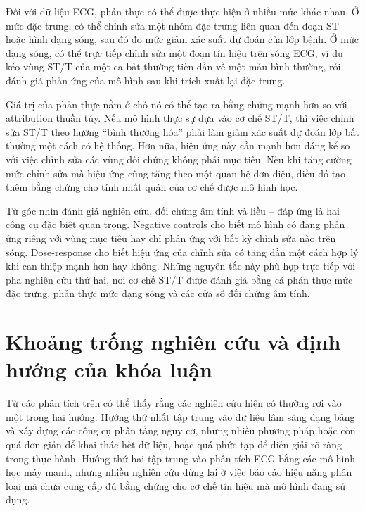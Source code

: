 Đối với dữ liệu ECG, phản thực có thể được thực hiện ở nhiều mức khác nhau. Ở mức đặc trưng, có thể chỉnh sửa một nhóm đặc trưng liên quan đến đoạn ST hoặc hình dạng sóng, sau đó đo mức giảm xác suất dự đoán của lớp bệnh. Ở mức dạng sóng, có thể trực tiếp chỉnh sửa một đoạn tín hiệu trên sóng ECG, ví dụ kéo vùng ST/T của một ca bất thường tiến dần về một mẫu bình thường, rồi đánh giá phản ứng của mô hình sau khi trích xuất lại đặc trưng.

\blocksep

Giá trị của phản thực nằm ở chỗ nó có thể tạo ra bằng chứng mạnh hơn so với attribution thuần túy. Nếu mô hình thực sự dựa vào cơ chế ST/T, thì việc chỉnh sửa ST/T theo hướng “bình thường hóa” phải làm giảm xác suất dự đoán lớp bất thường một cách có hệ thống. Hơn nữa, hiệu ứng này cần mạnh hơn đáng kể so với việc chỉnh sửa các vùng đối chứng không phải mục tiêu. Nếu khi tăng cường mức chỉnh sửa mà hiệu ứng cũng tăng theo một quan hệ đơn điệu, điều đó tạo thêm bằng chứng cho tính nhất quán của cơ chế được mô hình học.

\blocksep

Từ góc nhìn đánh giá nghiên cứu, đối chứng âm tính và liều -- đáp ứng là hai công cụ đặc biệt quan trọng. Negative controls cho biết mô hình có đang phản ứng riêng với vùng mục tiêu hay chỉ phản ứng với bất kỳ chỉnh sửa nào trên sóng. Dose-response cho biết hiệu ứng của chỉnh sửa có tăng dần một cách hợp lý khi can thiệp mạnh hơn hay không. Những nguyên tắc này phù hợp trực tiếp với pha nghiên cứu thứ hai, nơi cơ chế ST/T được đánh giá bằng cả phản thực mức đặc trưng, phản thực mức dạng sóng và các cửa sổ đối chứng âm tính.

\blocksep

\section{Khoảng trống nghiên cứu và định hướng của khóa luận}

\blocksep

Từ các phân tích trên có thể thấy rằng các nghiên cứu hiện có thường rơi vào một trong hai hướng. Hướng thứ nhất tập trung vào dữ liệu lâm sàng dạng bảng và xây dựng các công cụ phân tầng nguy cơ, nhưng nhiều phương pháp hoặc còn quá đơn giản để khai thác hết dữ liệu, hoặc quá phức tạp để diễn giải rõ ràng trong thực hành. Hướng thứ hai tập trung vào phân tích ECG bằng các mô hình học máy mạnh, nhưng nhiều nghiên cứu dừng lại ở việc báo cáo hiệu năng phân loại mà chưa cung cấp đủ bằng chứng cho cơ chế tín hiệu mà mô hình đang sử dụng.

